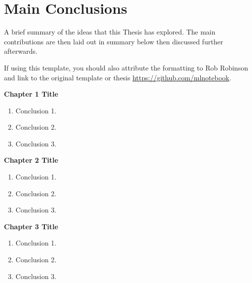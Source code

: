 \section{Main Conclusions}
\label{sec:6-main_conclusions}
\glsresetall

A brief summary of the ideas that this Thesis has explored. The main contributions are then laid out in summary below then discussed further afterwards.

If using this template, you should also attribute the formatting to Rob Robinson \parencite{robinson2020thesis} and link to the original template or thesis \url{https://github.com/mlnotebook}.

\begin{shaded*}
\textbf{Chapter 1 Title}
    \begin{enumerate}[wide, leftmargin=0.75cm, labelwidth=!, labelindent=0pt, label=\textbf{\Alph*}]
    \singlespacing
    \item Conclusion 1.
    \item Conclusion 2.
    \item Conclusion 3.
    \end{enumerate}
\end{shaded*}
\begin{shaded*}
\textbf{Chapter 2 Title}
    \begin{enumerate}[wide, leftmargin=0.75cm, labelwidth=!, labelindent=0pt, label=\textbf{\Alph*}]
    \singlespacing
    \item Conclusion 1.
    \item Conclusion 2.
    \item Conclusion 3.
    \end{enumerate}
\end{shaded*}
\begin{shaded*}
\textbf{Chapter 3 Title}
    \begin{enumerate}[wide, leftmargin=0.75cm, labelwidth=!, labelindent=0pt, label=\textbf{\Alph*}]
    \singlespacing
    \item Conclusion 1.
    \item Conclusion 2.
    \item Conclusion 3.
    \end{enumerate}
\end{shaded*}


